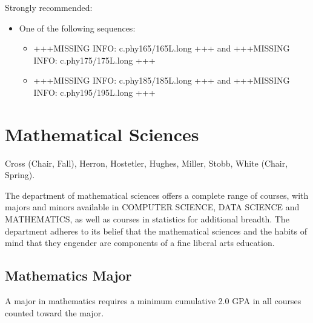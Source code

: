 \documentclass[
  letterpaper,
]{scrbook}
\providecommand{\tightlist}{%
  \setlength{\itemsep}{0pt}\setlength{\parskip}{0pt}}
\begin{document}
Strongly recommended:

\begin{itemize}
\tightlist
\item
  One of the following sequences:

  \begin{itemize}
  \tightlist
  \item
    +++MISSING INFO: c.phy165/165L.long +++ and +++MISSING INFO:
    c.phy175/175L.long +++
  \item
    +++MISSING INFO: c.phy185/185L.long +++ and +++MISSING INFO:
    c.phy195/195L.long +++
  \end{itemize}
\end{itemize}

\section{Mathematical Sciences}\label{sec-mathematical-sciences}

Cross (Chair, Fall), Herron, Hostetler, Hughes, Miller, Stobb, White
(Chair, Spring).

The department of mathematical sciences offers a complete range of
courses, with majors and minors available in COMPUTER SCIENCE, DATA
SCIENCE and MATHEMATICS, as well as courses in statistics for additional
breadth. The department adheres to its belief that the mathematical
sciences and the habits of mind that they engender are components of a
fine liberal arts education.

\subsection{Mathematics Major}\label{mathematics-major}

A major in mathematics requires a minimum cumulative 2.0 GPA in all
courses counted toward the major.
\end{document}

